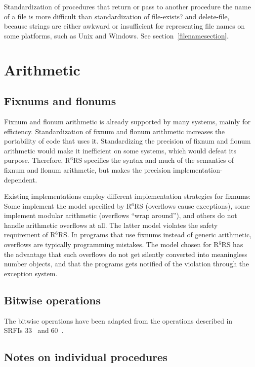 \documentclass[twoside,twocolumn]{algol60}
\newcommand{\rn}[1]{R$^{#1}$RS}
\begin{document}
Standardization of procedures that return or pass to another procedure
the name of a file is more difficult than standardization of {\cf
  file-exists?} and {\cf delete-file}, because strings are either
awkward or insufficient for representing file names on some platforms,
such as Unix and Windows.  See section~\ref{filenamesection}.

\chapter{Arithmetic}

\section{Fixnums and flonums}

Fixnum and flonum arithmetic is already supported by many systems,
mainly for efficiency. Standardization of fixnum and flonum arithmetic
increases the portability of code that uses it.  Standardizing the
precision of fixnum and flonum arithmetic would make it inefficient on
some systems, which would defeat its purpose.  Therefore, \rn{6}
specifies the syntax and much of the semantics of fixnum and flonum
arithmetic, but makes the precision implementation-dependent.

Existing implementations employ different implementation strategies
for fixnums: Some implement the model specified by \rn{6} (overflows
cause exceptions), some implement modular arithmetic (overflows ``wrap
around''), and others do not handle arithmetic overflows at all.  The
latter model violates the safety requirement of \rn{6}.  In programs
that use fixnums instead of generic arithmetic, overflows are
typically programming mistakes.  The model chosen for \rn{6} has the
advantage that such overflows do not get silently converted into
meaningless number objects, and that the programs gets notified of the
violation through the exception system.

\section{Bitwise operations}

The bitwise operations have been adapted from the operations described
in SRFIs 33~\cite{srfi33} and 60~\cite{srfi60}.

\section{Notes on individual procedures}
\end{document}
